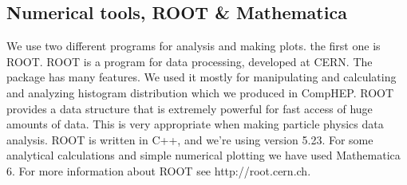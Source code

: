 \subsection{Numerical tools, ROOT \& Mathematica}
We use two different programs for analysis and making plots. the first one is ROOT. ROOT is a program for data processing, developed at CERN. The package has many features. We used it mostly for manipulating and calculating and analyzing histogram distribution which we produced in CompHEP. ROOT provides a data structure that is extremely powerful for fast access of huge amounts of data. This is very appropriate when making particle physics data analysis. ROOT is written in C++, and we're using version 5.23. For some analytical calculations and simple numerical plotting we have used Mathematica 6.  For more information about ROOT see http://root.cern.ch.
